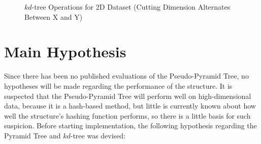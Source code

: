 \begin{figure}
	\begin{center}
	\end{center}

	\caption{$kd$-tree Operations for 2D Dataset (Cutting Dimension Alternates Between X and Y)}
	\label{fig:kd-tree}
\end{figure}

\section{Main Hypothesis}
\label{sec:main-hypothesis}

Since there has been no published evaluations of the Pseudo-Pyramid Tree, no hypotheses will be made regarding the performance of the structure. It is suspected that the Pseudo-Pyramid Tree will perform well on high-dimensional data, because it is a hash-based method, but little is currently known about how well the structure's hashing function performs, so there is a little basis for such suspicion. Before starting implementation, the following hypothesis regarding the Pyramid Tree and $kd$-tree was devised:

